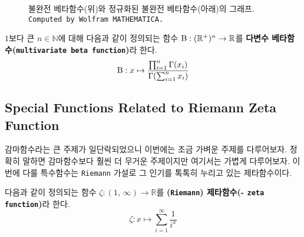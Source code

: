 \begin{figure}[!ht]
    \caption{불완전 베타함수(위)와 정규화된 불완전 베타함수(아래)의 그래프. \texttt{Computed by Wolfram MATHEMATICA.}}
\end{figure}

\begin{definition}
    $1$보다 큰 $n\in\mathbb{N}$에 대해 다음과 같이 정의되는 함수 $\mathrm{B}:(\mathbb{R}^+)^n\to\mathbb{R}$를 \textbf{다변수 베타함수(\texttt{multivariate beta function})}라 한다.
    \begin{equation*}
        \mathrm{B}:x\mapsto\frac{\prod_{i=1}^n\Gamma(x_i)}{\Gamma(\sum_{i=1}^nx_i)}
    \end{equation*}
\end{definition}

\subsection{Special Functions Related to Riemann Zeta Function}

감마함수라는 큰 주제가 일단락되었으니 이번에는 조금 가벼운 주제를 다루어보자. 정확히 말하면 감마함수보다 훨씬 더 무거운 주제이지만 여기서는 가볍게 다루어보자. 이번에 다룰 특수함수는 \texttt{Riemann} 가설로 그 인기를 톡톡히 누리고 있는 제타함수이다.

\begin{definition}
    다음과 같이 정의되는 함수 $\zeta:(1,\,\infty)\to\mathbb{R}$를 \textbf{(\texttt{Riemann}) 제타함수(- \texttt{zeta function})}라 한다.
    \begin{equation*}
        \zeta:x\mapsto\sum_{i=1}^\infty\frac{1}{i^x}
    \end{equation*}
\end{definition}

